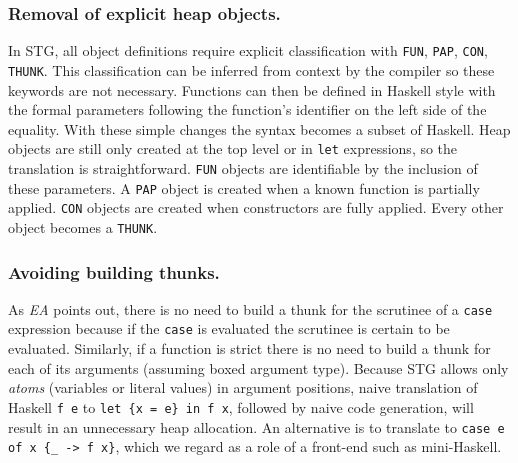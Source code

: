 \documentclass{llncs}
\begin{document}
\subsubsection{Removal of explicit heap objects.}
In STG, all object definitions require explicit classification with
\texttt{FUN}, \texttt{PAP}, \texttt{CON}, \texttt{THUNK}. This
classification can be inferred from context by the compiler so these
keywords are not necessary.  Functions can then be defined in Haskell
style with the formal parameters following the function's identifier
on the left side of the equality. With these simple changes the syntax
becomes a subset of Haskell. Heap objects are still only created at
the top level or in \texttt{let} expressions, so the translation is
straightforward.
\texttt{FUN} objects are
identifiable by the inclusion of these parameters.  A \texttt{PAP} object is
created when a known function is partially applied.  \texttt{CON} objects are
created when constructors are fully applied.  Every other object becomes a
\texttt{THUNK}.

\vspace{-0.1in}
\subsubsection{Avoiding building thunks.}
As \emph{EA} points out, there is no need to build a thunk for the scrutinee
of a \texttt{case} expression because if the \texttt{case} is evaluated the
scrutinee is certain to be evaluated.  Similarly, if a function is strict
there is no need to build a thunk for each of its arguments (assuming boxed
argument type).  Because STG allows only \emph{atoms} (variables or literal
values) in argument positions, naive translation of Haskell \texttt{f e} to
\texttt{let \{x = e\} in f x}, followed by naive code generation, will result in
an unnecessary heap allocation.  An alternative is to translate to
\texttt{case e of x \{\_ -> f x\}}, which we regard as a role of a front-end
such as mini-Haskell.

\vspace{-0.1in}
\end{document}
